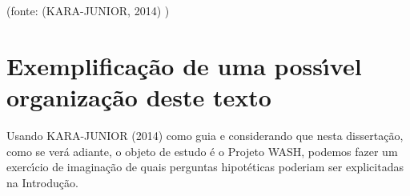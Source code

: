 \documentclass[
12pt,		%
openright,	%
twoside,  %
a4paper,			%
chapter=TITLE,		%
english,			%
french,				%
spanish,			%
brazil				%
]{USPSC-classe/USPSC_RedarTex}
\begin{document}
\begin{flushright}
\setlength{\absparsep}{0pt}
\tiny \begin{flushright}
\setlength{\absparsep}{0pt}
\tiny \begin{flushright}
\setlength{\absparsep}{0pt}
\tiny \begin{flushright}
\setlength{\absparsep}{0pt}
\tiny \begin{flushright}
\setlength{\absparsep}{0pt}
\tiny \begin{flushright}
\setlength{\absparsep}{0pt}
\tiny \begin{flushright}
\setlength{\absparsep}{0pt}
\tiny \begin{flushright}
\setlength{\absparsep}{0pt}
\tiny \begin{flushright}
\setlength{\absparsep}{0pt}
\tiny \begin{flushright}
\setlength{\absparsep}{0pt}
\tiny (fonte:  (KARA-JUNIOR, 2014) ) \normalsize 
\end{flushright}

 \normalsize 
\end{flushright}

 \normalsize 
\end{flushright}

 \normalsize 
\end{flushright}

 \normalsize 
\end{flushright}

 \normalsize 
\end{flushright}

 \normalsize 
\end{flushright}

 \normalsize 
\end{flushright}

 \normalsize 
\end{flushright}

 \normalsize 
\end{flushright}


\section[Exemplifica\c{c}\~ao de uma poss\'{\i}vel organiza\c{c}\~ao deste texto]{Exemplifica\c{c}\~ao de uma poss\'{\i}vel organiza\c{c}\~ao deste texto}\label{Exemplifica\c{c}\~ao de uma poss\'{\i}vel organiza\c{c}\~ao deste texto}
Usando  KARA-JUNIOR (2014) como guia e considerando que nesta disserta\c{c}\~ao, como se ver\'a adiante, o objeto de estudo \'e o Projeto WASH, podemos fazer um exerc\'{\i}cio de imagina\c{c}\~ao de quais perguntas hipot\'eticas poderiam ser explicitadas na Introdu\c{c}\~ao.
\end{document}
